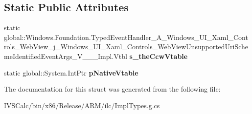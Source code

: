 \subsection*{Static Public Attributes}
\begin{DoxyCompactItemize}
\item 
\mbox{\label{struct_windows_1_1_foundation_1_1_typed_event_handler___a___windows___u_i___xaml___controls___we2ca8d6ce2726bd3be0205817ae158dc8_a230a65ca55b9e091c802552a12151145}} 
static global\+::\+Windows.\+Foundation.\+Typed\+Event\+Handler\+\_\+\+A\+\_\+\+Windows\+\_\+\+U\+I\+\_\+\+Xaml\+\_\+\+Controls\+\_\+\+Web\+View\+\_\+j\+\_\+\+Windows\+\_\+\+U\+I\+\_\+\+Xaml\+\_\+\+Controls\+\_\+\+Web\+View\+Unsupported\+Uri\+Scheme\+Identified\+Event\+Args\+\_\+\+V\+\_\+\+\_\+\+\_\+\+Impl.\+Vtbl {\bfseries s\+\_\+the\+Ccw\+Vtable}
\item 
\mbox{\label{struct_windows_1_1_foundation_1_1_typed_event_handler___a___windows___u_i___xaml___controls___we2ca8d6ce2726bd3be0205817ae158dc8_aa7f26ad4f4d78e32e1f86de8c5a36fa4}} 
static global\+::\+System.\+Int\+Ptr {\bfseries p\+Native\+Vtable}
\end{DoxyCompactItemize}


The documentation for this struct was generated from the following file\+:\begin{DoxyCompactItemize}
\item 
I\+V\+S\+Calc/bin/x86/\+Release/\+A\+R\+M/ilc/Impl\+Types.\+g.\+cs\end{DoxyCompactItemize}
